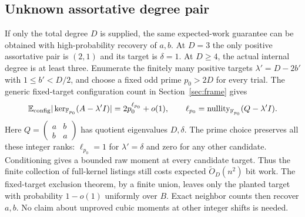 \subsection{Unknown assortative degree pair}
If only the total degree $D$ is supplied, the same expected-work
guarantee can be obtained with high-probability recovery of $a,b$.
At $D=3$ the only positive assortative pair is $(2,1)$ and its target
is $\delta=1$. At $D\ge4$, the actual internal degree is at least
three. Enumerate the finitely many positive targets
$\lambda'=D-2b'$ with $1\le b'<D/2$, and choose a fixed odd prime
$p_0>2D$ for every trial. The generic fixed-target configuration
count in Section~\ref{sec:frame} gives
\[
 \mathbb E_{\rm config}|\ker_{\mathbb F_{p_0}}(A-\lambda'I)|
 =2p_0^{\ell_{p_0}}+o(1),\qquad
 \ell_{p_0}=\operatorname{nullity}_{\mathbb F_{p_0}}(Q-\lambda'I).
\]
Here $Q=\left(\begin{smallmatrix}a&b\\b&a\end{smallmatrix}\right)$
has quotient eigenvalues $D,\delta$. The prime choice preserves all
these integer ranks: $\ell_{p_0}=1$ for $\lambda'=\delta$ and zero
for any other candidate. Conditioning gives a bounded raw moment
at every candidate target. Thus the finite collection of full-kernel
listings still costs expected $\widetilde O_D(n^2)$ bit work.
The fixed-target exclusion theorem, by a finite union, leaves only
the planted target with probability $1-o(1)$ uniformly over $B$.
Exact neighbor counts then recover $a,b$. No claim about unproved
cubic moments at other integer shifts is needed.
